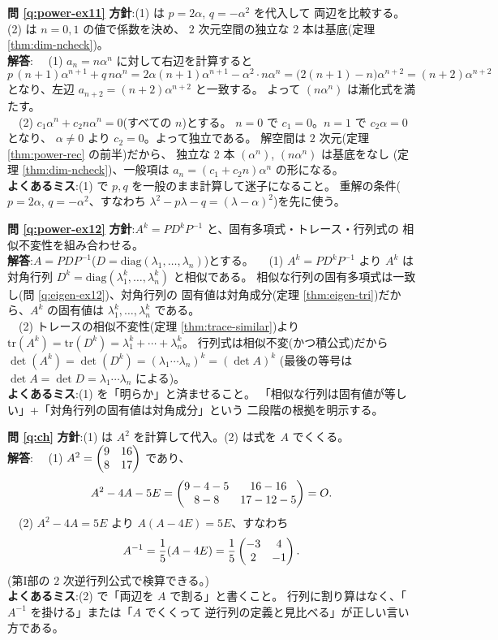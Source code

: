 \bigskip
\noindent\textbf{問 \ref{q:power-ex11}}\quad
\textbf{方針}:(1) は $p = 2\alpha$, $q = -\alpha^2$ を代入して
両辺を比較する。(2) は $n = 0, 1$ の値で係数を決め、
$2$ 次元空間の独立な $2$ 本は基底(定理 \ref{thm:dim-ncheck})。\\
\textbf{解答}:
　(1) $a_n = n\alpha^n$ に対して右辺を計算すると
\[
p\,(n+1)\alpha^{n+1} + q\,n\alpha^n
= 2\alpha(n+1)\alpha^{n+1} - \alpha^2 \cdot n\alpha^n
= \bigl(2(n+1) - n\bigr)\alpha^{n+2} = (n+2)\alpha^{n+2}
\]
となり、左辺 $a_{n+2} = (n+2)\alpha^{n+2}$ と一致する。
よって $(n\alpha^n)$ は漸化式を満たす。\\
　(2) $c_1\alpha^n + c_2 n\alpha^n = 0$(すべての $n$)とする。
$n = 0$ で $c_1 = 0$。$n = 1$ で $c_2\alpha = 0$ となり、
$\alpha \neq 0$ より $c_2 = 0$。よって独立である。
解空間は $2$ 次元(定理 \ref{thm:power-rec} の前半)だから、
独立な $2$ 本 $(\alpha^n)$, $(n\alpha^n)$ は基底をなし
(定理 \ref{thm:dim-ncheck})、一般項は
$a_n = (c_1 + c_2 n)\alpha^n$ の形になる。\\
\textbf{よくあるミス}:(1) で $p, q$ を一般のまま計算して迷子になること。
重解の条件($p = 2\alpha$, $q = -\alpha^2$、すなわち
$\lambda^2 - p\lambda - q = (\lambda - \alpha)^2$)を先に使う。

\bigskip
\noindent\textbf{問 \ref{q:power-ex12}}\quad
\textbf{方針}:$A^k = PD^kP^{-1}$ と、固有多項式・トレース・行列式の
相似不変性を組み合わせる。\\
\textbf{解答}:$A = PDP^{-1}$($D = \mathrm{diag}(\lambda_1, \dots,
\lambda_n)$)とする。
　(1) $A^k = PD^kP^{-1}$ より $A^k$ は対角行列
$D^k = \mathrm{diag}(\lambda_1^k, \dots, \lambda_n^k)$ と相似である。
相似な行列の固有多項式は一致し(問 \ref{q:eigen-ex12})、対角行列の
固有値は対角成分(定理 \ref{thm:eigen-tri})だから、$A^k$ の固有値は
$\lambda_1^k, \dots, \lambda_n^k$ である。\\
　(2) トレースの相似不変性(定理 \ref{thm:trace-similar})より
$\mathrm{tr}(A^k) = \mathrm{tr}(D^k) = \lambda_1^k + \cdots + \lambda_n^k$。
行列式は相似不変(かつ積公式)だから
$\det(A^k) = \det(D^k) = (\lambda_1 \cdots \lambda_n)^k = (\det A)^k$
(最後の等号は $\det A = \det D = \lambda_1 \cdots \lambda_n$ による)。\\
\textbf{よくあるミス}:(1) を「明らか」と済ませること。
「相似な行列は固有値が等しい」+「対角行列の固有値は対角成分」という
二段階の根拠を明示する。

\bigskip
\noindent\textbf{問 \ref{q:ch}}\quad
\textbf{方針}:(1) は $A^2$ を計算して代入。(2) は式を $A$ でくくる。\\
\textbf{解答}:
　(1) $A^2 = \begin{pmatrix}9 & 16 \\ 8 & 17\end{pmatrix}$ であり、
\[
A^2 - 4A - 5E = \begin{pmatrix}9 - 4 - 5 & 16 - 16 \\ 8 - 8 & 17 - 12 - 5\end{pmatrix} = O.
\]
　(2) $A^2 - 4A = 5E$ より $A(A - 4E) = 5E$、すなわち
\[
A^{-1} = \frac{1}{5}(A - 4E) = \frac{1}{5}\begin{pmatrix}-3 & 4 \\ 2 & -1\end{pmatrix}.
\]
(第I部の $2$ 次逆行列公式で検算できる。)\\
\textbf{よくあるミス}:(2) で「両辺を $A$ で割る」と書くこと。
行列に割り算はなく、「$A^{-1}$ を掛ける」または「$A$ でくくって
逆行列の定義と見比べる」が正しい言い方である。

